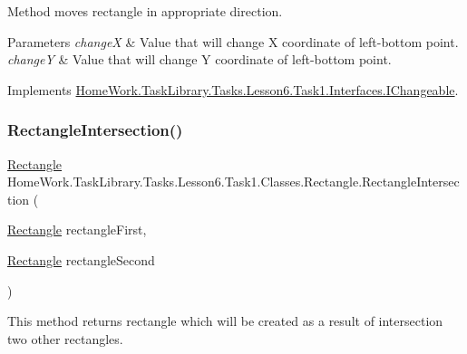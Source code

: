 Method moves rectangle in appropriate direction. 


\begin{DoxyParams}{Parameters}
{\em changeX} & Value that will change X coordinate of left-\/bottom point.\\
\hline
{\em changeY} & Value that will change Y coordinate of left-\/bottom point.\\
\hline
\end{DoxyParams}


Implements \mbox{\hyperlink{interface_home_work_1_1_task_library_1_1_tasks_1_1_lesson6_1_1_task1_1_1_interfaces_1_1_i_changeable_a7a582bc0f96f4617d8a1667da950e389}{Home\+Work.\+Task\+Library.\+Tasks.\+Lesson6.\+Task1.\+Interfaces.\+I\+Changeable}}.

\mbox{\label{class_home_work_1_1_task_library_1_1_tasks_1_1_lesson6_1_1_task1_1_1_classes_1_1_rectangle_a540b2bede0e35e5144af2439abacb469}} 
\subsubsection{\texorpdfstring{RectangleIntersection()}{RectangleIntersection()}}
{\footnotesize\ttfamily \mbox{\hyperlink{class_home_work_1_1_task_library_1_1_tasks_1_1_lesson6_1_1_task1_1_1_classes_1_1_rectangle}{Rectangle}} Home\+Work.\+Task\+Library.\+Tasks.\+Lesson6.\+Task1.\+Classes.\+Rectangle.\+Rectangle\+Intersection (\begin{DoxyParamCaption}\item[{\mbox{\hyperlink{class_home_work_1_1_task_library_1_1_tasks_1_1_lesson6_1_1_task1_1_1_classes_1_1_rectangle}{Rectangle}}}]{rectangle\+First,  }\item[{\mbox{\hyperlink{class_home_work_1_1_task_library_1_1_tasks_1_1_lesson6_1_1_task1_1_1_classes_1_1_rectangle}{Rectangle}}}]{rectangle\+Second }\end{DoxyParamCaption})}



This method returns rectangle which will be created as a result of intersection two other rectangles. 


